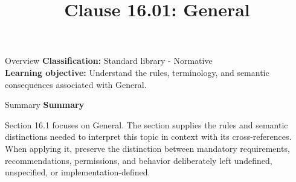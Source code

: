 \documentclass[10pt,letterpaper]{article}
\title{Clause 16.01: General}
\author{}
\date{}
\begin{document}
\maketitle
\begin{CornellOverviewBox}{Overview}
\textbf{Classification:} Standard library - Normative\\[2pt]
\textbf{Learning objective:} Understand the rules, terminology, and semantic consequences associated with General.
\end{CornellOverviewBox}\begin{CornellSummaryBox}{Summary}
{\sffamily\bfseries\color{Accent} Summary}\par\vspace{3pt}Section 16.1 focuses on General. The section supplies the rules and semantic distinctions needed to interpret this topic in context with its cross-references. When applying it, preserve the distinction between mandatory requirements, recommendations, permissions, and behavior deliberately left undefined, unspecified, or implementation-defined.
\end{CornellSummaryBox}
\end{document}
